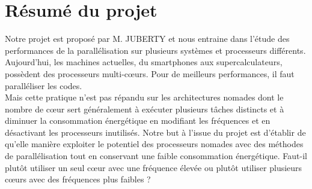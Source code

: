 \chapter{Résumé du projet}

Notre projet est proposé par M. JUBERTY et nous entraine dans l'étude des performances de la parallélisation sur plusieurs systèmes et processeurs différents. Aujourd'hui, les machines actuelles, du smartphones aux supercalculateurs, possèdent des processeurs multi-cœurs. Pour de meilleurs performances, il faut paralléliser les codes. 
\\	Mais cette pratique n'est pas répandu sur les architectures nomades dont le nombre de cœur sert généralement à exécuter plusieurs tâches distincts et à diminuer la consommation énergétique en modifiant les fréquences et en désactivant les processeurs inutilisés. Notre but à l'issue du projet est d'établir de qu'elle manière exploiter le potentiel des processeurs nomades avec des méthodes de parallélisation tout en conservant une faible consommation énergétique. Faut-il plutôt utiliser un seul cœur avec une fréquence élevée ou plutôt utiliser plusieurs cœurs avec des fréquences plus faibles ?
       